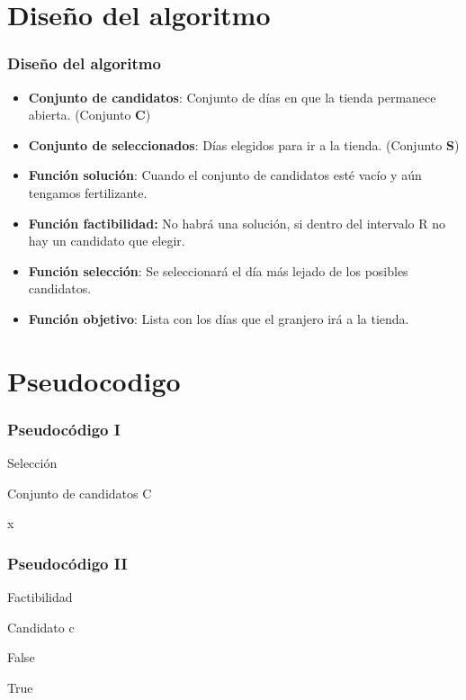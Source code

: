 \documentclass{beamer}
\begin{document}
\section{Diseño del algoritmo} 
\begin{frame}
	\frametitle{Diseño del algoritmo}
	\begin{itemize}
		\item \textbf{Conjunto de candidatos}: Conjunto de días en que la tienda permanece abierta. (Conjunto \textbf{C})
		\item \textbf{Conjunto de seleccionados}: Días elegidos para ir a la tienda. (Conjunto \textbf{S})
		\item \textbf{Función solución}: Cuando el conjunto de candidatos esté vacío y aún tengamos fertilizante.
		\item \textbf{Función factibilidad:} No habrá una solución, si dentro del intervalo R no hay un candidato que elegir.
		\item \textbf{Función selección}: Se seleccionará el día más lejado de los posibles candidatos.
		\item \textbf{Función objetivo}: Lista con los días que el granjero irá a la tienda.		
	\end{itemize}
	
\end{frame}

\section{Pseudocodigo}
\begin{frame}
	\frametitle{Pseudocódigo I}
	Selección

	\begin{algorithmic}
	\Require Conjunto de candidatos C
		\EndIf
	\EndFor  
	
	\Return x	
	\end{algorithmic}	
\end{frame}

\begin{frame}
	\frametitle{Pseudocódigo II}

	Factibilidad
	\begin{algorithmic}

	\Require Candidato c
	
 	   		
 	   		\Return False
 	   	\Else 
 	   	
 	   		\Return True 	   	
 	   	\EndIf
 	 
  	
		\end{algorithmic}	
\end{frame}
\end{document}
